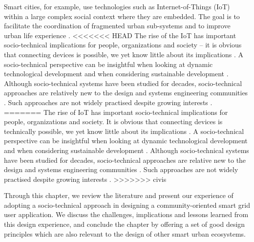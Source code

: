 Smart cities, for example, use technologies such as Internet-of-Things (IoT) within a large complex social context where they are embedded. The goal is to facilitate the coordination of fragmented urban sub-systems and to improve urban  life experience \cite{Glasmeier2015}. 
% 
<<<<<<< HEAD
The rise of the IoT has important socio-technical implications for people, organizations and society -- it is obvious that connecting devices is possible, we yet know little about its implications \cite{Shin2014}. A socio-technical perspective can be insightful when looking at dynamic technological development and when considering sustainable development \cite{Shin2014}. Although socio-technical systems have been studied for decades, socio-technical approaches are relatively new to the design and systems engineering communities \cite{Baxter2011,Norman2015,Sawyer2014}. Such approaches are not widely practised despite growing interests \cite{Baxter2011}. %
=======
The rise of IoT has important socio-technical implications for people, organizations and society. It is obvious that connecting devices is technically possible, we yet know little about its implications \cite{Shin2014}. A socio-technical perspective can be insightful when looking at dynamic technological development and when considering sustainable development \cite{Shin2014}. Although socio-technical systems have been studied for decades, socio-technical approaches are relative new to the design and systems engineering communities \cite{Baxter2011,Norman2015,Sawyer2014}. Such approaches are not widely practised despite growing interests \cite{Baxter2011}. %
>>>>>>> civis

\begin{svgraybox}
Through this chapter, we review the literature and present our experience of adopting a socio-technical approach in designing a community-oriented smart grid user application. We discuss the challenges, implications and lessons learned from this design experience, and conclude the chapter by offering a set of good design principles which are also relevant to the design of other smart urban ecosystems. 

\end{svgraybox}
